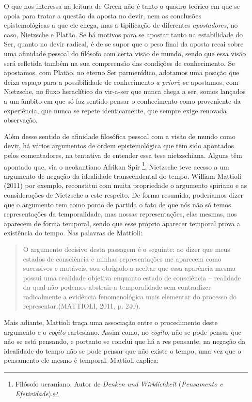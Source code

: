 \documentclass[
	12pt,				%
	openright,			%
	oneside,			%
	a4paper,			%
	english,			%
	french,				%
	spanish,			%
	brazil				%
	]{abntex2}
\begin{document}
O que nos interessa na leitura de Green não é tanto o quadro teórico em que se apoia para tratar a questão da aposta no devir, nem as conclusões epistemológicas a que ele chega, mas a tipificação de diferentes \textit{apostadores}, no caso, Nietzsche e Platão. Se há motivos para se apostar tanto na estabilidade do Ser, quanto no devir radical, é de se supor que o peso final da aposta recai sobre uma afinidade pessoal do filósofo com certa visão de mundo, sendo que essa visão será refletida também na sua compreensão das condições de conhecimento. Se apostamos, com Platão, no eterno Ser parmenídico, adotamos uma posição que deixa espaço para a possibilidade de conhecimento \textit{a priori}; se apostamos, com Nietzsche, no fluxo heraclítico do vir-a-ser que nunca chega a ser, somos lançados a um âmbito em que só faz sentido pensar o conhecimento como proveniente da experiência, que nunca se repete identicamente, que sempre exige renovada observação.

Além desse sentido de afinidade filosófica pessoal com a visão de mundo como devir, há vários argumentos de ordem epistemológica que têm sido apontados pelos comentadores, na tentativa de entender essa tese nietzschiana. Alguns têm apontado que, via o neokantiano Afrikan Spir
\footnote{Filósofo ucraniano. Autor de \textit{Denken und Wirklichkeit} (\textit{Pensamento e Efetividade}). }, Nietzsche teve acesso a um argumento de negação da idealidade transcendental do tempo. William Mattioli (2011) por exemplo, reconstitui com muita propriedade o argumento spiriano e as considerações de Nietzsche a este respeito. De forma resumida, poderíamos dizer que o argumento tem como ponto de partida o fato de que nós não só temos representações da temporalidade, mas nossas representações, elas mesmas, nos aparecem de forma temporal, sendo que esse próprio aparecer temporal prova a existência do tempo. Nas palavras de Mattioli:

\begin{quotation}
O argumento decisivo desta passagem é o seguinte: ao dizer que meus estados de consciência e minhas representações me aparecem como sucessivos e mutáveis, sou obrigado a aceitar que essa aparência mesma possui uma realidade objetiva enquanto estado de consciência – realidade da qual não podemos abstrair a temporalidade sem contradizer radicalmente a evidência fenomenológica mais elementar do processo do representar.(MATTIOLI, 2011, p. 240).
\end{quotation}

Mais adiante, Mattioli traça uma associação entre o procedimento deste argumento e o \textit{cogito} cartesiano. Assim como, no \textit{cogito}, não se pode pensar que não se está pensando, e portanto se conclui que há a res pensante, na negação da idealidade do tempo não se pode pensar que não existe o tempo, uma vez que o pensamento ele mesmo é temporal. Mattioli explica:
\end{document}
